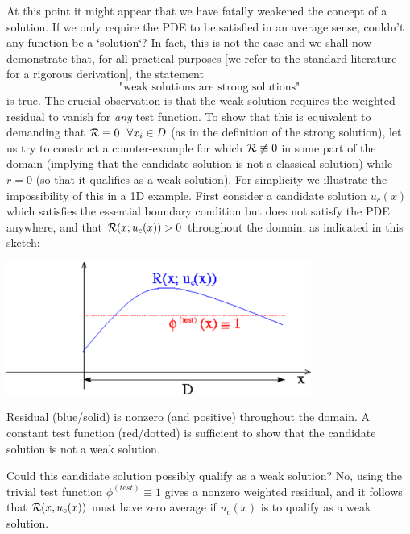 At this point it might appear that we have fatally weakened the concept of a solution. If we only require the P\-D\-E to be satisfied in an average sense, couldn't any function be a \char`\"{}solution\char`\"{}? In fact, this is not the case and we shall now demonstrate that, for all practical purposes \mbox{[}we refer to the standard literature for a rigorous derivation\mbox{]}, the statement \[ \mbox{ "weak solutions are strong solutions" } \] is true. The crucial observation is that the weak solution requires the weighted residual to vanish for {\itshape any} test function. To show that this is equivalent to demanding that $ {\cal R} \equiv 0 \ \ \forall x_i \in D $ (as in the definition of the strong solution), let us try to construct a counter-\/example for which $ {\cal R} \not\equiv 0 $ in some part of the domain (implying that the candidate solution is not a classical solution) while $r=0$ (so that it qualifies as a weak solution). For simplicity we illustrate the impossibility of this in a 1\-D example. First consider a candidate solution $ u_c(x)$ which satisfies the essential boundary condition but does not satisfy the P\-D\-E anywhere, and that $ {\cal R}(x; u_c(x)) > 0 $ throughout the domain, as indicated in this sketch\-:  
\begin{DoxyImage}
\includegraphics[width=0.75\textwidth]{weaksoln1}
\caption{Residual (blue/solid) is nonzero (and positive) throughout the domain. A constant test function (red/dotted) is sufficient to show that the candidate solution is not a weak solution. }
\end{DoxyImage}
 Could this candidate solution possibly qualify as a weak solution? No, using the trivial test function $ \phi^{(test)} \equiv 1 $ gives a nonzero weighted residual, and it follows that $ {\cal R}(x, u_c(x)) $ must have zero average if $ u_c(x) $ is to qualify as a weak solution.

